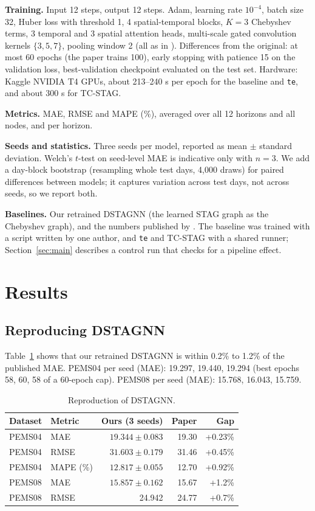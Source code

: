 \documentclass[conference]{IEEEtran}
\begin{document}
\textbf{Training.} Input 12 steps, output 12 steps. Adam, learning rate $10^{-4}$, batch size 32, Huber loss with threshold 1, 4 spatial-temporal blocks, $K=3$ Chebyshev terms, 3 temporal and 3 spatial attention heads, multi-scale gated convolution kernels $\{3,5,7\}$, pooling window 2 (all as in \cite{lan2022dstagnn}). Differences from the original: at most 60 epochs (the paper trains 100), early stopping with patience 15 on the validation loss, best-validation checkpoint evaluated on the test set. Hardware: Kaggle NVIDIA T4 GPUs, about 213--240 s per epoch for the baseline and \texttt{te}, and about 300 s for TC-STAG.

\textbf{Metrics.} MAE, RMSE and MAPE (\%), averaged over all 12 horizons and all nodes, and per horizon.

\textbf{Seeds and statistics.} Three seeds per model, reported as mean $\pm$ standard deviation. Welch's $t$-test on seed-level MAE is indicative only with $n=3$. We add a day-block bootstrap (resampling whole test days, 4,000 draws) for paired differences between models; it captures variation across test days, not across seeds, so we report both.

\textbf{Baselines.} Our retrained DSTAGNN (the learned STAG graph as the Chebyshev graph), and the numbers published by \cite{lan2022dstagnn}. The baseline was trained with a script written by one author, and \texttt{te} and TC-STAG with a shared runner; Section~\ref{sec:main} describes a control run that checks for a pipeline effect.

\section{Results}
\subsection{Reproducing DSTAGNN}\label{sec:repro}
Table~\ref{tab:repro} shows that our retrained DSTAGNN is within 0.2\% to 1.2\% of the published MAE. PEMS04 per seed (MAE): 19.297, 19.440, 19.294 (best epochs 58, 60, 58 of a 60-epoch cap). PEMS08 per seed (MAE): 15.768, 16.043, 15.759.

\begin{table}[t]
\centering\caption{Reproduction of DSTAGNN.}\label{tab:repro}
\footnotesize
\begin{tabular}{@{}llrrr@{}}
\toprule
Dataset & Metric & Ours (3 seeds) & Paper & Gap\\
\midrule
PEMS04 & MAE & $19.344\pm0.083$ & 19.30 & +0.23\%\\
PEMS04 & RMSE & $31.603\pm0.179$ & 31.46 & +0.45\%\\
PEMS04 & MAPE (\%) & $12.817\pm0.055$ & 12.70 & +0.92\%\\
PEMS08 & MAE & $15.857\pm0.162$ & 15.67 & +1.2\%\\
PEMS08 & RMSE & 24.942 & 24.77 & +0.7\%\\
\bottomrule
\end{tabular}
\end{table}
\end{document}
